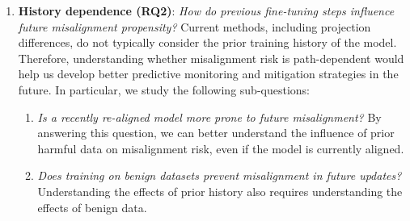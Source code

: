 \begin{enumerate}
\begin{enumerate}
    \end{enumerate}
    \item \textbf{History dependence (RQ2)}: \textit{How do previous fine-tuning steps influence future misalignment propensity?} Current methods, including projection differences, do not typically consider the prior training history of the model. Therefore, understanding whether misalignment risk is path-dependent would help us develop better predictive monitoring and mitigation strategies in the future. In particular, we study the following sub-questions:
    \begin{enumerate}
        \item \textit{Is a recently re-aligned model more prone to future misalignment?} By answering this question, we can better understand the influence of prior harmful data on misalignment risk, even if the model is currently aligned.
        \item \textit{Does training on benign datasets prevent misalignment in future updates?} Understanding the effects of prior history also requires understanding the effects of benign data. 
    \end{enumerate}
\end{enumerate}



